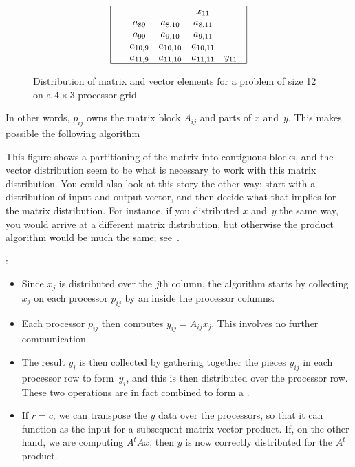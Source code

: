 \begin{figure}[ht]
{\[\begin{array}{| c | c | c | c |}
&
\begin{array}{c c c c}
&&x_{11}\\
a_{89} &   a_{8,10} &  a_{8,11} & \\
a_{99} &   a_{9,10} &  a_{9,11} & \\
a_{10,9} & a_{10,10} & a_{10,11} & \\
a_{11,9} & a_{11,10} & a_{11,11} & y_{11} \\
\end{array}
\\ \hline
\end{array}
\]
}
\caption{Distribution of matrix and vector elements for a problem of size 12 on a $4\times 3$ processor grid}
\label{fig:2dmatrix}
\end{figure}

In other words, $ p_{ij} $ owns the matrix block $A_{ij}$
and parts of $x$ and~$y$. This makes possible the following algorithm
\begin{footnoteenv}
{This figure shows a partitioning of the matrix into contiguous blocks,
and the vector distribution seem to be what is necessary to work with this 
matrix distribution. You could also look at this story the other way:
start with a distribution of input and output vector, and then decide what
that implies for the matrix distribution. For instance, if you distributed
$x$ and~$y$ the same way, you would arrive at a different matrix distribution,
but otherwise the product algorithm would be much the same;
see~\cite{Flame:PBMD-report}.}
\end{footnoteenv}%
:
\begin{itemize}
\item Since $x_j$ is distributed over the $j$th column, the algorithm starts
  by collecting $x_j$ on each processor $p_{ij}$ by an
   inside the processor columns.
\item Each processor $p_{ij}$ then computes $y_{ij} = A_{ij}x_j$. This
  involves no further communication.
\item The result $y_i$ is then collected by gathering together the
  pieces $y_{ij}$ in each processor row to form~$y_i$, and this is then
  distributed over the processor row. These two operations are in fact
  combined to form a .
\item If $r=c$, we can transpose the $y$ data over the processors, so
  that it can function as the input for a subsequent matrix-vector
  product. If, on the other hand, we are computing $A^tAx$, then $y$
  is now correctly distributed for the $A^t$ product.
\end{itemize}


